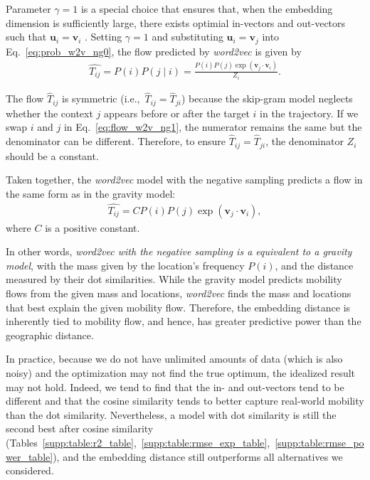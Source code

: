 \documentclass[12pt,a4paper]{article}
\newcommand{\vect}[1]{\boldsymbol{#1}}
\def\given{\mid}
\def\ie{i.e.,~}
\begin{document}
Parameter $\gamma=1$ is a special choice that ensures that, when the embedding dimension is sufficiently large, there exists optimial in-vectors and out-vectors such that $\vect{u}_i = \vect{v}_i$ \autocite{levy2014neural}.
Setting $\gamma = 1$ and substituting $\vect{u}_i = \vect{v}_j$ into Eq.~\ref{eq:prob_w2v_ng0}, the flow predicted by {\it word2vec} is given by
\begin{align}
	\hat{T_{ij}}= P(i) P(j\given i) = \frac{P(i)P(j)\exp(\vect{v}_j \cdot \vect{v}_{i})}{Z_i}. \label{eq:flow_w2v_ng1}
\end{align}

The flow $\hat{T}_{ij}$ is symmetric (\ie $\hat{T}_{ij}=\hat{T}_{ji}$) because the skip-gram model neglects whether the context $j$ appears before or after the target $i$ in the trajectory.
If we swap $i$ and $j$ in Eq.~\ref{eq:flow_w2v_ng1}, the numerator remains the same but the denominator can be different.
Therefore, to ensure $\hat{T}_{ij} = \hat{T}_{ji}$, the denominator $Z_i$ should be a constant.

Taken together, the {\it word2vec} model with the negative sampling predicts a flow in the same form as in the gravity model:
\begin{align}
	\hat{T_{ij}}=  C P(i) P(j)  \exp(\vect{v}_j \cdot \vect{v}_{i}), \label{eq:flow_w2v_ng0}
\end{align}
where $C$ is a positive constant.

In other words, \emph{word2vec with the negative sampling is a equivalent to a gravity model}, with the mass given by the location's frequency $P(i)$, and the distance measured by their dot similarities.
While the gravity model predicts mobility flows from the given mass and locations, {\it word2vec} finds the mass and locations that best explain the given mobility flow.
Therefore, the embedding distance is inherently tied to mobility flow, and hence, has greater predictive power than the geographic distance.

In practice, because we do not have unlimited amounts of data (which is also noisy) and the optimization may not find the true optimum, the idealized result may not hold.
Indeed, we tend to find that the in- and out-vectors tend to be different and that the cosine similarity tends to better capture real-world mobility than the dot similarity.
Nevertheless, a model with dot similarity is still the second best after cosine similarity (Tables~\ref{supp:table:r2_table},~\ref{supp:table:rmse_exp_table},~\ref{supp:table:rmse_power_table}), and the embedding distance still outperforms all alternatives we considered.
\end{document}
